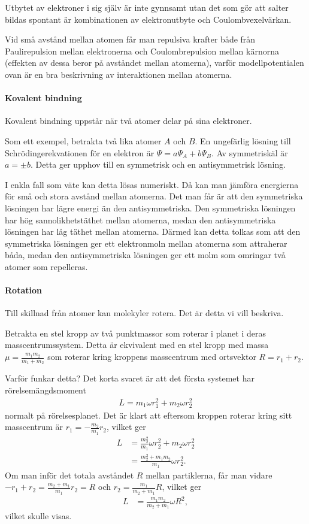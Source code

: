 Utbytet av elektroner i sig själv är inte gynnsamt utan det som gör att salter bildas spontant är kombinationen av elektronutbyte och Coulombvexelvärkan.

Vid små avstånd mellan atomen får man repulsiva krafter både från Paulirepulsion mellan elektronerna och Coulombrepulsion mellan kärnorna (effekten av dessa beror på avståndet mellan atomerna), varför modellpotentialen ovan är en bra beskrivning av interaktionen mellan atomerna.

\paragraph{Kovalent bindning}
Kovalent bindning uppstår när två atomer delar på sina elektroner.

Som ett exempel, betrakta två lika atomer $A$ och $B$. En ungefärlig lösning till Schrödingerekvationen för en elektron är $\Psi = a\Psi_{A} + b\Psi_{B}$. Av symmetriskäl är $a = \pm b$. Detta ger upphov till en symmetrisk och en antisymmetrisk lösning.

I enkla fall som väte kan detta lösas numeriskt. Då kan man jämföra energierna för små och stora avstånd mellan atomerna. Det man får är att den symmetriska lösningen har lägre energi än den antisymmetriska. Den symmetriska lösningen har hög sannolikhetstäthet mellan atomerna, medan den antisymmetriska lösningen har låg täthet mellan atomerna. Därmed kan detta tolkas som att den symmetriska lösningen ger ett elektronmoln mellan atomerna som attraherar båda, medan den antisymmetriska lösningen ger ett molm som omringar två atomer som repelleras.

\paragraph{Rotation}
Till skillnad från atomer kan molekyler rotera. Det är detta vi vill beskriva.

Betrakta en stel kropp av två punktmassor som roterar i planet i deras masscentrumssystem. Detta är ekvivalent med en stel kropp med massa $\mu = \frac{m_{1}m_{2}}{m_{1} + m_{2}}$ som roterar kring kroppens masscentrum med ortsvektor $R = r_{1} + r_{2}$.

Varför funkar detta? Det korta svaret är att det första systemet har rörelsemängdsmoment
\begin{align*}
	L = m_{1}\omega r_{1}^{2} + m_{2}\omega r_{2}^{2}
\end{align*}
normalt på rörelsesplanet. Det är klart att eftersom kroppen roterar kring sitt masscentrum är $r_{1} = -\frac{m_{2}}{m_{1}}r_{2}$, vilket ger
\begin{align*}
	L &= \frac{m_{2}^{2}}{m_{1}}\omega r_{2}^{2} + m_{2}\omega r_{2}^{2} \\
	  &= \frac{m_{2}^{2} + m_{1}m_{2}}{m_{1}}\omega r_{2}^{2}.
\end{align*}
Om man inför det totala avståndet $R$ mellan partiklerna, får man vidare $-r_{1} + r_{2} = \frac{m_{2} + m_{1}}{m_{1}}r_{2} = R$ och $r_{2} = \frac{m_{1}}{m_{2} + m_{1}}R$, vilket ger
\begin{align*}
	L &= \frac{m_{1}m_{2}}{m_{2} + m_{1}}\omega R^{2},
\end{align*}
vilket skulle visas.

